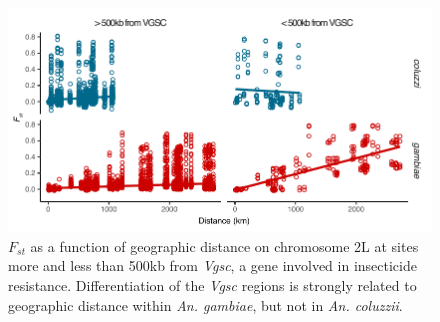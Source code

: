 \documentclass[a4paper,11pt,abstracton,hidelinks]{scrartcl}
\begin{document}
\begin{figure}[H]
    \begin{center}
    \includegraphics[width=\textwidth]{artwork/fst_by_dist_species_VGSC_edit.pdf}
    \end{center}
    \caption{$F_{st}$ as a function of geographic distance on chromosome 2L at sites more and less than 500kb from \textit{Vgsc}, a gene involved in insecticide resistance. Differentiation of the \textit{Vgsc} regions is strongly related to geographic distance within \textit{An. gambiae}, but not in \textit{An. coluzzii}.}
    \label{fig:vgsc_ibd}
\end{figure}

%

\clearpage
\end{document}
